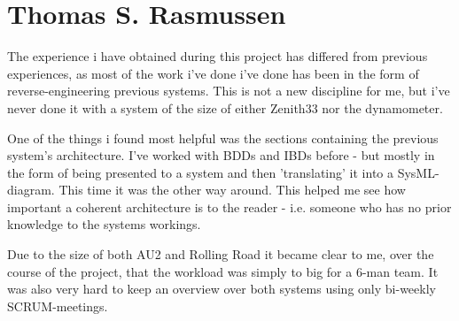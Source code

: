 \section{Thomas S. Rasmussen}
The experience i have obtained during this project has differed from previous experiences, as most of the work i've done i've done has been in the form of reverse-engineering previous systems. This is not a new discipline for me, but i've never done it with a system of the size of either Zenith33 nor the dynamometer.

One of the things i found most helpful was the sections containing the previous system's architecture. I've worked with BDDs and IBDs before - but mostly in the form of being presented to a system and then 'translating' it into a SysML-diagram. This time it was the other way around. This helped me see how important a coherent architecture is to the reader - i.e. someone who has no prior knowledge to the systems workings.

Due to the size of both AU2 and Rolling Road it became clear to me, over the course of the project, that the workload was simply to big for a 6-man team. It was also very hard to keep an overview over both systems using only bi-weekly SCRUM-meetings.